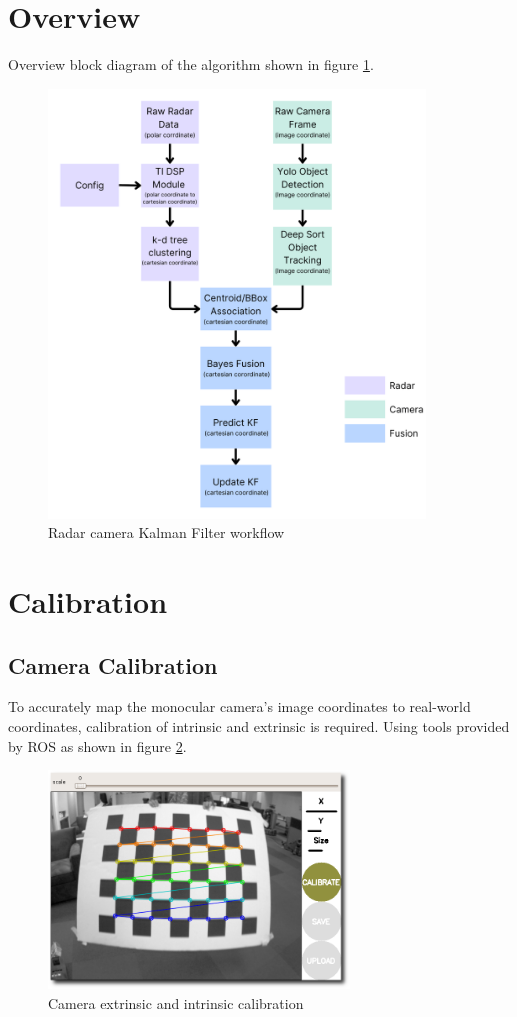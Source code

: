 \section{Overview}\label{sec:2-overview}
Overview block diagram of the algorithm shown in figure \ref*{fig:kf_update}.
\begin{figure}[hpbt]
    \centering
    \includegraphics[width=10cm]{Figures/kf_update-modified.png}%
    \caption{Radar camera Kalman Filter workflow}
    \label{fig:kf_update}
\end{figure}

\section{Calibration}\label{sec:2-calibration}
\subsection{Camera Calibration}
To accurately map the monocular camera's image coordinates to real-world coordinates, calibration of intrinsic and extrinsic is required.
Using tools provided by ROS \cite{cam_calib} as shown in figure \ref*{fig:camera_calibration}.

\begin{figure}[hpbt]
    \centering
    \includegraphics[width=8cm]{Figures/cam_calib.png}%
    \caption{Camera extrinsic and intrinsic calibration}
    \label{fig:camera_calibration}
\end{figure}

